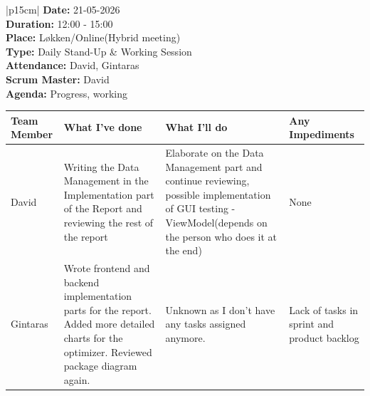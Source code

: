\begin{table}[H]
    \centering
    \begin{tabular}{|p{15cm}|}   
        \hline
        \textbf{Date:}  21-05-2026 \\
        \textbf{Duration:}  12:00 - 15:00 \\
        \textbf{Place:}  Løkken/Online(Hybrid meeting) \\
        \textbf{Type:} Daily Stand-Up \& Working Session \\
        \textbf{Attendance:}  David, Gintaras\\
        \textbf{Scrum Master:}  David \\
        \textbf{Agenda:} Progress, working
        \begin{table}[H]
            \begin{tabular}{|p{1.75cm}|p{4cm}|p{4cm}|p{4cm}|}
                \hline
                \cellcolor[HTML]{BFBFBF}  \textbf{Team Member} & \cellcolor[HTML]{BFBFBF}  \textbf{What I've done} & \cellcolor[HTML]{BFBFBF}  \textbf{What I'll do} & \cellcolor[HTML]{BFBFBF}  \textbf{Any Impediments}\\
                \hline
                \cellcolor[HTML]{d4d4d4} David & Writing the Data Management in the Implementation part of the Report and reviewing the rest of the report & Elaborate on the Data Management part and continue reviewing, possible implementation of GUI testing - ViewModel(depends on the person who does it at the end) & None \\
                \hline
                \cellcolor[HTML]{d4d4d4} Gintaras & Wrote frontend and backend implementation parts for the report. Added more detailed charts for the optimizer. Reviewed package diagram again. & Unknown as I don’t have any tasks assigned anymore. & Lack of tasks in sprint and product backlog \\
                \hline
            \end{tabular}
        \end{table} \\
        \hline
    \end{tabular}
\end{table}

